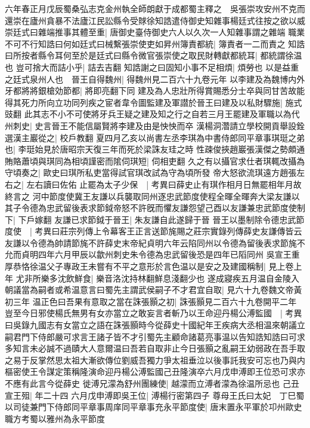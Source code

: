 六年春正月戊辰蜀桑弘志克金州執全師朗獻于成都蜀主釋之　吳張崇攻安州不克而還崇在廬州貪暴不法廬江民訟縣令受賕徐知誥遣侍御史知雜事楊廷式往按之欲以威崇廷式曰雜端推事其體至重|{
	唐御史臺侍御史六人以久次一人知雜事謂之雜端}
職業不可不行知誥曰何如廷式曰械繫張崇使吏如昇州簿責都統|{
	簿責者一二而責之}
知誥曰所按者縣令耳何至於是廷式曰縣令微官張崇使之取民財轉獻都統耳|{
	都統謂徐温也}
豈可捨大而詰小乎|{
	詰去吉翻}
知誥謝之曰固知小事不足相煩|{
	煩勞也}
以是益重之廷式泉州人也　晉王自得魏州|{
	得魏州見二百六十九卷元年}
以李建及為魏博内外牙都將將銀槍効節都|{
	將即亮翻下同}
建及為人忠壯所得賞賜悉分士卒與同甘苦故能得其死力所向立功同列疾之宦者韋令圖監建及軍譛於晉王曰建及以私財驟施|{
	施式豉翻}
此其志不小不可使將牙兵王疑之建及知之行之自若三月王罷建及軍職以為代州刺史|{
	史言晉王不能信屬賢將李建及由是怏怏而卒}
漢楊洞濳請立學校開貢舉設銓選漢主巖從之|{
	校戶教翻}
夏四月乙亥以尚書左丞李琪為中書侍郎同平章事琪珽之弟也|{
	李珽始見於唐昭宗天復三年而死於梁誅友珪之時}
性疎俊挾趙巖張漢傑之勢頗通賄賂蕭頃與琪同為相頃謹密而隂伺琪短|{
	伺相吏翻}
久之有以攝官求仕者琪輒改攝為守頃奏之|{
	歐史曰琪所私吏當得試官琪改試為守為頃所發}
帝大怒欲流琪遠方趙張左右之|{
	左右讀曰佐佑}
止罷為太子少保　|{
	考異曰薛史止有琪作相月日無罷相年月故終言之}
河中節度使冀王友謙以兵襲取同州逐忠武節度使程全暉全暉奔大梁友謙以其子令德為忠武留後表求節鉞帝怒不許旣而懼友謙怨望己酉以友謙兼忠武節度使制下|{
	下戶嫁翻}
友謙已求節鉞于晉王|{
	朱友謙自此遂歸于晉}
晉王以墨制除令德忠武節度使　|{
	考異曰莊宗列傳上令幕客王正言送節旄賜之莊宗實錄列傳薛史友謙傳皆云友謙以令德為帥請節旄不許薛史末帝紀貞明六年云陷同州以令德為留後表求節旄不允而貞明四年六月甲辰以歙州刺史朱令德為忠武留後恐是四年已䧟同州}
吳宣王重厚恭恪徐温父子專政王未嘗有不平之意形於言色温以是安之及建國稱制|{
	見上卷上年}
尤非所樂多沈飲鮮食|{
	樂音洛沈持林翻鮮息淺翻少也}
遂成寢疾五月温自金陵入朝議當為嗣者或希温意言曰蜀先主謂武侯嗣子不才君宜自取|{
	見六十九卷魏文帝黃初三年}
温正色曰吾果有意取之當在誅張顥之初|{
	誅張顥見二百六十九卷開平二年}
豈至今日邪使楊氏無男有女亦當立之敢妄言者斬乃以王命迎丹楊公溥監國　|{
	考異曰吳錄九國志有女當立之語在誅張顥時今從薛史十國紀年王疾病大丞相温來朝議立嗣君門下侍郎嚴可求言王諸子皆不才引蜀先主顧命諸葛亮事温以告知誥知誥曰可求多知言未必誠不過賾大人意爾温曰吾若自取非止今日張顥之亂嗣王幼弱政在吾手取之易于反掌然思太祖大漸欲傳位劉威吾獨力爭太祖垂泣以後事託我安可忘也乃與内樞密使王令謀定策稱隆演命迎丹楊公溥監國己丑隆演卒六月戊申溥即王位恐可求亦不應有此言今從薛史}
徙溥兄濛為舒州團練使|{
	越濛而立溥者濛為徐温所忌也}
己丑宣王殂|{
	年二十四}
六月戊申溥即吳王位|{
	溥楊行密第四子}
尊母王氏曰太妃　丁巳蜀以司徒兼門下侍郎同平章事周庠同平章事充永平節度使|{
	唐末置永平軍於卭州歐史職方考蜀以雅州為永平節度}
